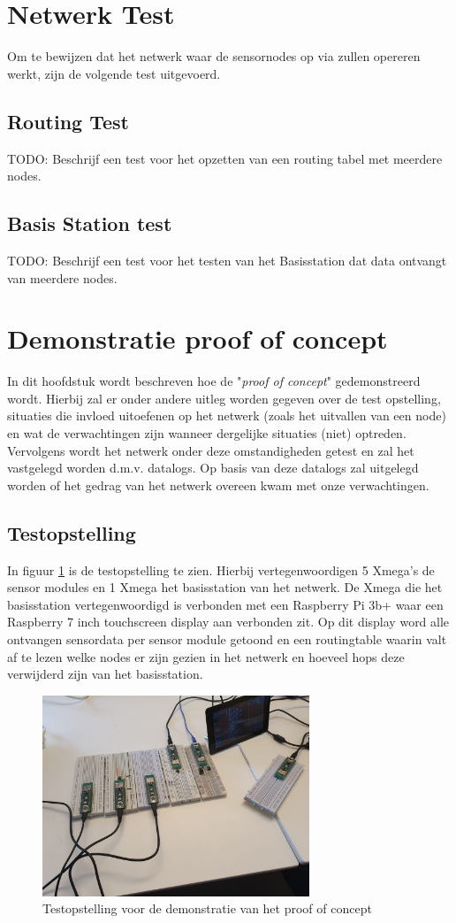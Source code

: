 \documentclass[a4paper, 11pt]{article}
\begin{document}
\section{Netwerk Test}
Om te bewijzen dat het netwerk waar de sensornodes op via zullen opereren werkt, zijn de volgende test uitgevoerd. 
\subsection{Routing Test}
TODO: Beschrijf een test voor het opzetten van een routing tabel met meerdere nodes.
\subsection{Basis Station test}
TODO: Beschrijf een test voor het testen van het Basisstation dat data ontvangt van meerdere nodes. 
\section{Demonstratie proof of concept}
In dit hoofdstuk wordt beschreven hoe de "\textit{proof of concept}" gedemonstreerd wordt. Hierbij zal er onder andere uitleg worden gegeven over de test opstelling, situaties die invloed uitoefenen op het netwerk (zoals het uitvallen van een node) en wat de verwachtingen zijn wanneer dergelijke situaties (niet) optreden. Vervolgens wordt het netwerk onder deze omstandigheden getest en zal het vastgelegd worden d.m.v. datalogs. Op basis van deze datalogs zal uitgelegd worden of het gedrag van het netwerk overeen kwam met onze verwachtingen.
\newpage
\subsection{Testopstelling}
In figuur \ref{testopstelling} is de testopstelling te zien. Hierbij vertegenwoordigen 5 Xmega's de sensor modules en 1 Xmega het basisstation van het netwerk. De Xmega die het basisstation vertegenwoordigd is verbonden met een Raspberry Pi 3b+  waar een Raspberry 7 inch touchscreen display aan verbonden zit. Op dit display word alle ontvangen sensordata per sensor module getoond en een routingtable waarin valt af te lezen welke nodes er zijn gezien in het netwerk en hoeveel hops deze verwijderd zijn van het basisstation.
\begin{figure}[h!]
	\centering
	\includegraphics[width=8cm]{media/testOpstellingNetwerk.jpeg}
	\caption{Testopstelling voor de demonstratie van het proof of concept} \label{testopstelling}
\end{figure}
\end{document}
